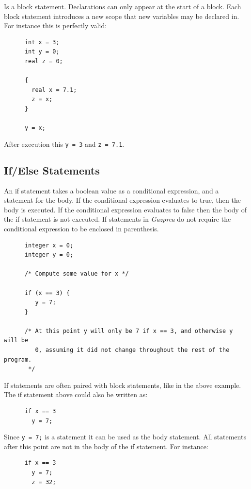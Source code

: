 \documentclass{article}
\begin{document}
    Is a block statement. Declarations can only appear at the start of a block.  Each block statement introduces a
    new scope that new variables may be declared in. For instance this is perfectly valid:

    \begin{lstlisting}
      int x = 3;
      int y = 0;
      real z = 0;

      {
        real x = 7.1;
        z = x;
      }

      y = x;
    \end{lstlisting}

    After execution this \texttt{y = 3} and \texttt{z = 7.1}.


  \subsection{If/Else Statements}\label{sec:conditional}

    An if statement takes a boolean value as a conditional expression, and a statement for the body. If the
    conditional expression evaluates to true, then the body is executed. If the conditional expression evaluates to
    false then the body of the if statement is not executed. If statements in \textit{Gazprea} do not require the
    conditional expression to be enclosed in parenthesis.

    \begin{lstlisting}
      integer x = 0;
      integer y = 0;

      /* Compute some value for x */

      if (x == 3) {
         y = 7;
      }

      /* At this point y will only be 7 if x == 3, and otherwise y will be
         0, assuming it did not change throughout the rest of the program.
       */
    \end{lstlisting}

    If statements are often paired with block statements, like in the above example. The if statement above could
    also be written as:

    \begin{lstlisting}
      if x == 3
        y = 7;
    \end{lstlisting}

    Since \texttt{y = 7;} is a statement it can be used as the body statement. All statements after this point are
    not in the body of the if statement. For instance:

    \begin{lstlisting}
      if x == 3
        y = 7;
        z = 32;
    \end{lstlisting}
\end{document}
